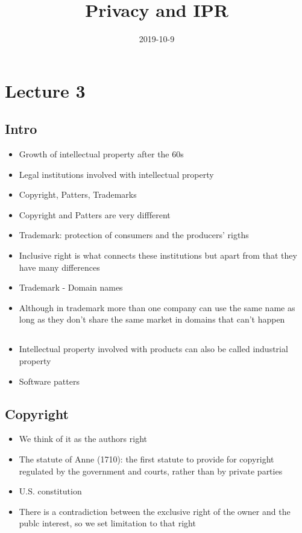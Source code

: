 \documentclass{article}
\title{Privacy and IPR}
\date{2019-10-9}
\begin{document}
   \maketitle
   \newpage

\section{Lecture 3}

\subsection{Intro}
\begin{itemize}
\item Growth of intellectual property after the 60s
\item Legal institutions involved with intellectual property 
\item Copyright, Patters, Trademarks
\item Copyright and Patters are very diffferent 
\item Trademark: protection of consumers and the producers' rigths 
\item Inclusive right is what connects these institutions but apart from that they have many differences 
\item Trademark - Domain names 
\item Although in trademark more than one company can use the same name as long as they don't share the same market in domains that can't happen 
\end{itemize}

\subsection{}
\begin{itemize}
\item Intellectual property involved with products can also be called industrial property 
\item Software patters 
\end{itemize}

\subsection{Copyright} 
\begin{itemize}
\item We think of it as the authors right 
\item The statute of Anne (1710): the first statute to provide for copyright regulated by the government and courts, rather than by private parties
\item U.S. constitution
\item There is a contradiction between the exclusive right of the owner and the publc interest, so we set limitation to that right 
\end{itemize}
\end{document}
